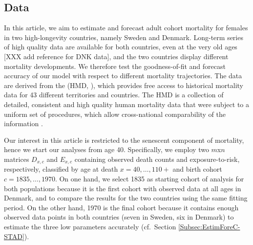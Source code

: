 \documentclass[11pt, a4paper]{article}
\begin{document}
\subsection{Data}
\label{Subsec:Data}
In this article, we aim to estimate and forecast adult cohort mortality for females in two high-longevity countries, namely Sweden and Denmark. Long-term series of high quality data are available for both countries, even at the very old ages \citep{vaupel1994longer,wilmoth1996extreme}[XXX add reference for DNK data], and the two countries display different mortality developments. We therefore test the goodness-of-fit and forecast accuracy of our model with respect to different mortality trajectories. The data are derived from the \citeauthor{HMD} (HMD, \citeyear{HMD}), which provides free access to historical mortality data for 43 different territories and countries. The HMD is a collection of detailed, consistent and high quality human mortality data that were subject to a uniform set of procedures, which allow cross-national comparability of the information \citep{barbieri2015data}. \par \par 
Our interest in this article is restricted to the senescent component of mortality, hence we start our analyses from age 40. Specifically, we employ two $m$x$n$ matrices $D_{x,c}$ and $E_{x,c}$ containing observed death counts and exposure-to-risk, respectively, classified by age at death $x=40,\ldots, 110+$ and birth cohort $c=1835,\ldots,1970$. On one hand, we select 1835 as starting cohort of analysis for both populations because it is the first cohort with observed data at all ages in Denmark, and to compare the results for the two countries using the same fitting period. On the other hand, 1970 is the final cohort because it contains enough observed data points in both countries (seven in Sweden, six in Denmark) to estimate the three low parameters accurately (cf.~Section \ref{Subsec:EstimForeC-STAD}). \par
\end{document}
